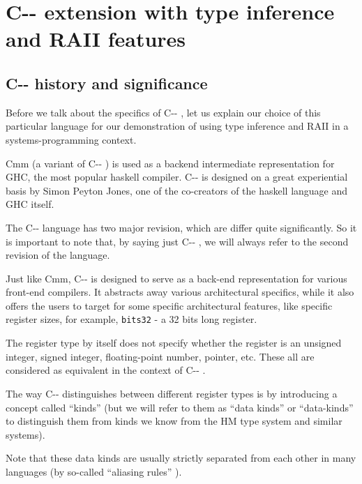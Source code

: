 
\providecommand{\cmm}[0]{ C-{}- }

\chapter{\cmm extension with type inference and RAII features}

\label{chap2}



\section{\cmm history and significance}

Before we talk about the specifics of \cmm, let us explain our choice of this particular language for our demonstration of using type inference and RAII in a systems-programming context.

Cmm (a variant of \cmm) is used as a backend intermediate representation for GHC, the most popular haskell compiler. \cmm is designed on a great experiential basis by Simon Peyton Jones, one of the co-creators of the haskell language and GHC itself.

\begin{remark}
    The \cmm language has two major revision, which are differ quite significantly. So it is important to note that, by saying just \cmm, we will always refer to the second revision of the language.
\end{remark}

Just like Cmm, \cmm is designed to serve as a back-end representation for various front-end compilers. It abstracts away various architectural specifics, while it also offers the users to target for some specific architectural features, like specific register sizes, for example, \lstinline{bits32} - a 32 bits long register.

The register type by itself does not specify whether the register is an unsigned integer, signed integer, floating-point number, pointer, etc. These all are considered as equivalent in the context of \cmm.

The way \cmm distinguishes between different register types is by introducing a concept called ``kinds'' (but we will refer to them as ``data kinds'' or ``data-kinds'' to distinguish them from kinds we know from the HM type system and similar systems).

Note that these data kinds are usually strictly separated from each other in many languages (by so-called ``aliasing rules'' ).

